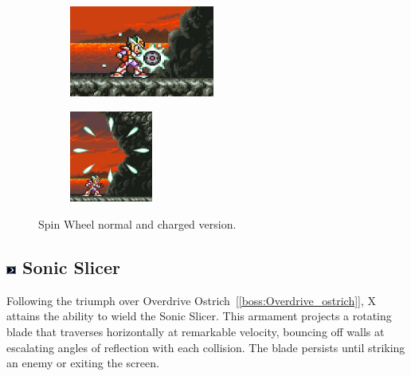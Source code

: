 \begin{figure}[htp]
	\centering
	\begin{subfigure}{0.4\linewidth}
		\centering
		\includegraphics[height=3cm]{figures/X2/weapons/S_wheel_1.png}	
	\end{subfigure}
	\begin{subfigure}{0.3\linewidth}
		\centering
		\includegraphics[height=3cm]{figures/X2/weapons/S_wheel_2.png}	
	\end{subfigure}
	\caption{Spin Wheel normal and charged version.}
\end{figure}

\subsection{\includegraphics[width=12px, height=10px]{figures/X2/weapons/S_slicer.png} Sonic Slicer}\label{Sonic_slicer}
Following the triumph over Overdrive Ostrich~[\ref{boss:Overdrive_ostrich}], X attains the ability to wield the Sonic Slicer. This armament projects a rotating blade that traverses horizontally at remarkable velocity, bouncing off walls at escalating angles of reflection with each collision. The blade persists until striking an enemy or exiting the screen.

